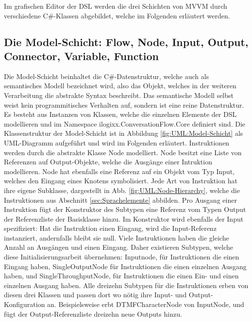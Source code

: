 \newline
Im grafischen Editor der DSL werden die drei Schichten von MVVM durch verschiedene C\#-Klassen abgebildet, welche im Folgenden erläutert werden.

\subsection[Die Model-Schicht]{Die Model-Schicht: Flow, Node, Input, Output, Connector, Variable, Function}
\label{subsec:Die Model-Schicht}
Die Model-Schicht beinhaltet die C\#-Datenstruktur, welche auch als semantisches Modell bezeichnet wird, also das Objekt, welches in der weiteren Verarbeitung die abstrakte Syntax beschreibt. Das semantische Modell selbst weist kein programmitisches Verhalten auf, sondern ist eine reine Datenstruktur. Es besteht aus Instanzen von Klassen, welche die einzelnen Elemente der DSL modellieren und im Namespace ilogixx.ConversationFlow.Core definiert sind. Die Klassenstruktur der Model-Schicht ist in Abbildung \ref{fig:UML:Model-Schicht} als UML-Diagramm aufgeführt und wird im Folgenden erläutert.
\newline
Instruktionen werden durch die abstrakte Klasse Node modelliert. Node besitzt eine Liste von Referenzen auf Output-Objekte, welche die Ausgänge einer Intruktion modellieren. Node hat ebenfalls eine Referenz auf ein Objekt vom Typ Input, welches den Eingang eines Knotens symbolisiert. Jede Art von Instruktion hat ihre eigene Subklasse, dargestellt in Abb. \ref{fig:UML:Node-Hierarchy}, welche die Instruktionen aus Abschnitt \ref{sec:Sprachelemente} abbilden. Pro Ausgang einer Instruktion fügt der Konstruktor des Subtypen eine Referenz vom Typen Output der Referenzliste der Basisklasse hinzu. Im Konstruktor wird ebenfalls der Input spezifiziert: Hat die Instruktion einen Eingang, wird die Input-Referenz instanziert, andernfalls bleibt sie null. Viele Instruktionen haben die gleiche Anzahl an Ausgängen und einen Eingang. Daher existieren Subtypen, welche diese Initialisierungsarbeit übernehmen: Inputnode, für Instruktionen die einen Eingang haben, SingleOutputNode für Instruktionen die einen einzelnen Ausgang haben, und SingleThroughputNode, für Instruktionen die einen Ein- und einen einzelnen Ausgang haben. Alle dreizehn Subtypen für die Instruktionen erben von diesen drei Klassen und passen dort wo nötig ihre Input- und Output-Konfiguration an. Beispielsweise erbt DTMFCharacterNode von InputNode, und fügt der Output-Referenzliste dreizehn neue Outputs hinzu.
\newline
